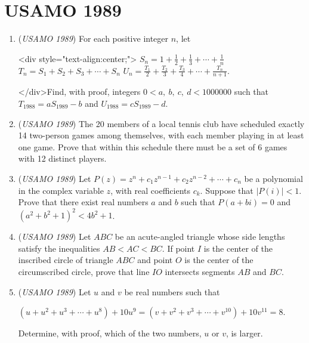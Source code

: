\section{USAMO 1989}
        \begin{enumerate}
        	\item (\textit{USAMO 1989}) For each positive integer $n$, let


 <div style="text-align:center;">
$S_n = 1 + \frac 12 + \frac 13 + \cdots + \frac 1n$
$T_n = S_1 + S_2 + S_3 + \cdots + S_n$
$U_n = \frac{T_1}{2} + \frac{T_2}{3} + \frac{T_3}{4} + \cdots + \frac{T_n}{n+1}$.


 
</div>Find, with proof, integers $0 < a,\ b,\ c,\ d < 1000000$ such that $T_{1988} = a S_{1989} - b$ and $U_{1988} = c S_{1989} - d$.


 

	\item (\textit{USAMO 1989}) The 20 members of a local tennis club have scheduled exactly 14 two-person games among themselves, with each member playing in at least one game. Prove that within this schedule there must be a set of 6 games with 12 distinct players.


 

	\item (\textit{USAMO 1989}) Let $P(z)= z^n + c_1 z^{n-1} + c_2 z^{n-2} + \cdots + c_n$ be a polynomial in the complex variable $z$, with real coefficients $c_k$. Suppose that $|P(i)| < 1$. Prove that there exist real numbers $a$ and $b$ such that $P(a + bi) = 0$ and $(a^2 + b^2 + 1)^2 < 4 b^2 + 1$.


 

	\item (\textit{USAMO 1989}) Let $ABC$ be an acute-angled triangle whose side lengths satisfy the inequalities $AB < AC < BC$. If point $I$ is the center of the inscribed circle of triangle $ABC$ and point $O$ is the center of the circumscribed circle, prove that line $IO$ intersects segments $AB$ and $BC$.


 

	\item (\textit{USAMO 1989}) Let $u$ and $v$ be real numbers such that


 $(u + u^2 + u^3 + \cdots + u^8) + 10u^9 = (v + v^2 + v^3 + \cdots + v^{10}) + 10v^{11} = 8.$


 Determine, with proof, which of the two numbers, $u$ or $v$, is larger.


 

\end{enumerate}